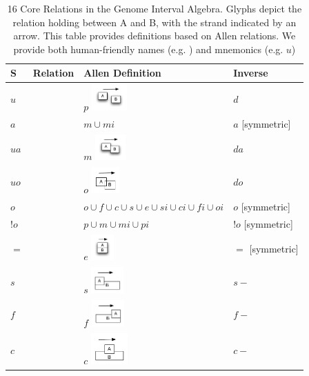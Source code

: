 \documentclass{article}
\def\upstreamOf{\pr{upstream\_of}}
\def\downstreamOf{\pr{downstream\_of}}
\def\adjacentTo{\pr{adjacent\_to}}
\def\upstreamAdjacentTo{\pr{upstream\_adjacent\_to}}
\def\downstreamAdjacentTo{\pr{downstream\_adjacent\_to}}
\def\upstreamOverlaps{\pr{upstream\_overlaps}}
\def\downstreamOverlaps{\pr{downstream\_overlaps}}
\def\overlaps{\pr{overlaps}}
\def\containedBy{\pr{nt\_contained\_by}}
\def\contains{\pr{nt\_contains}}
\def\disconnectedFrom{\pr{disconnected\_from}}
\def\coextensiveWith{\pr{coextensive\_with}}
\def\starts{\pr{starts}}
\def\startedBy{\pr{started\_by}}
\def\finishes{\pr{finishes}}
\def\finishedBy{\pr{finished\_by}}
\begin{document}
\begin{table}
\begin{tabular}{ | p{5mm} | p{3cm} | p{3cm} | p{3cm} | }
\hline
S & Relation  & Allen Definition  & Inverse \\
\hline
$u$ & \upstreamOf {} & $p$ \includegraphics[height=1cm]{u}  & $d$ \small{\downstreamOf} \\
\hline
$a$ & \adjacentTo & $m \cup mi$ & $a$  [symmetric] \\
\hline
$ua$ & \small{\upstreamAdjacentTo} {} & $m$ \includegraphics[height=1cm]{ua}   & $da$ \small{\downstreamAdjacentTo} \\
\hline
$uo$ & \small{\upstreamOverlaps} {} & $o$ \includegraphics[height=1cm]{uo} & $do$ \small{\downstreamOverlaps} \\
\hline
$o$ & \overlaps & $o \cup f \cup c \cup s \cup e \cup si \cup ci \cup fi \cup oi$  & $o$ [symmetric] \\
\hline
$!o$ & \disconnectedFrom & $p \cup m \cup mi \cup pi$  & $!o$ [symmetric] \\
\hline
$=$ & \coextensiveWith {} &  $e$  \includegraphics[height=1cm]{eq}  & $=$ [symmetric] \\
\hline
$s$ & \starts {} & $s$ \includegraphics[height=1cm]{s} &  $s-$ \small{\startedBy} \\
\hline
$f$ & \finishes {} & $f$ \includegraphics[height=1cm]{f} &  $f-$ \small{\finishedBy} \\
\hline
$c$ & \containedBy {} & $c$ \includegraphics[height=1.2cm]{p} &  $c-$ \small{\contains} \\
\hline
\end{tabular}
\caption{16 Core Relations in the Genome Interval Algebra. Glyphs depict
  the relation holding between A and B, with the strand indicated by an arrow.
  This table provides definitions based on Allen relations. We provide both human-friendly names (e.g. \upstreamOf) and mnemonics (e.g. $u$) }
\label{tab:relations}
\end{table}
\end{document}
